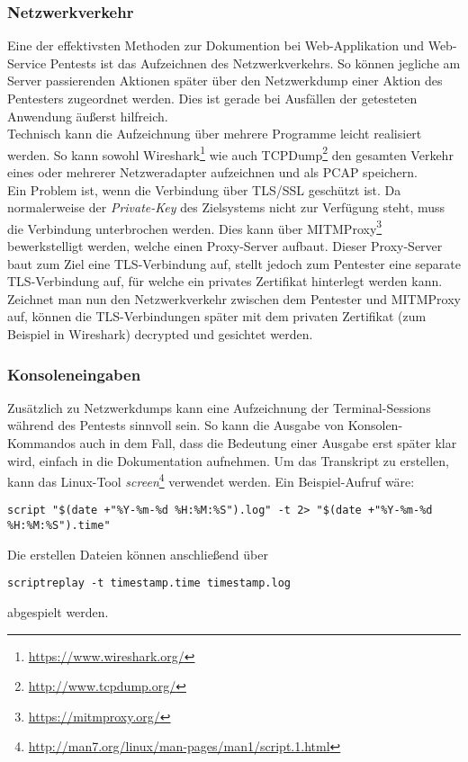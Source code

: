 		\subsubsection{Netzwerkverkehr}
		Eine der effektivsten Methoden zur Dokumention bei Web-Applikation und Web-Service Pentests ist das Aufzeichnen des Netzwerkverkehrs. So können jegliche am Server passierenden Aktionen später über den Netzwerkdump einer Aktion des Pentesters zugeordnet werden. Dies ist gerade bei Ausfällen der getesteten Anwendung äußerst hilfreich.\\
		
		Technisch kann die Aufzeichnung über mehrere Programme leicht realisiert werden. So kann sowohl Wireshark\footnote{\url{https://www.wireshark.org/}} wie auch TCPDump\footnote{\url{http://www.tcpdump.org/}} den gesamten Verkehr eines oder mehrerer Netzweradapter aufzeichnen und als PCAP speichern.\\
		
		Ein Problem ist, wenn die Verbindung über TLS/SSL geschützt ist. Da normalerweise der \textit{Private-Key} des Zielsystems nicht zur Verfügung steht, muss die Verbindung unterbrochen werden. Dies kann über MITMProxy\footnote{\url{https://mitmproxy.org/}} bewerkstelligt werden, welche einen Proxy-Server aufbaut. Dieser Proxy-Server baut zum Ziel eine TLS-Verbindung auf, stellt jedoch zum Pentester eine separate TLS-Verbindung auf, für welche ein privates Zertifikat hinterlegt werden kann. Zeichnet man nun den Netzwerkverkehr zwischen dem Pentester und MITMProxy auf, können die TLS-Verbindungen später mit dem privaten Zertifikat (zum Beispiel in Wireshark) decrypted und gesichtet werden.
		
		\subsubsection{Konsoleneingaben}
		Zusätzlich zu Netzwerkdumps kann eine Aufzeichnung der Terminal-Sessions während des Pentests sinnvoll sein. So kann die Ausgabe von Konsolen-Kommandos auch in dem Fall, dass die Bedeutung einer Ausgabe erst später klar wird, einfach in die Dokumentation aufnehmen. Um das Transkript zu erstellen, kann das Linux-Tool \textit{screen}\footnote{\url{http://man7.org/linux/man-pages/man1/script.1.html}} verwendet werden. Ein Beispiel-Aufruf wäre:
\lstset{language=bash}
\begin{lstlisting}
script "$(date +"%Y-%m-%d %H:%M:%S").log" -t 2> "$(date +"%Y-%m-%d %H:%M:%S").time"
\end{lstlisting}
Die erstellen Dateien können anschließend über 
\begin{lstlisting}
scriptreplay -t timestamp.time timestamp.log
\end{lstlisting}
abgespielt werden.
		
